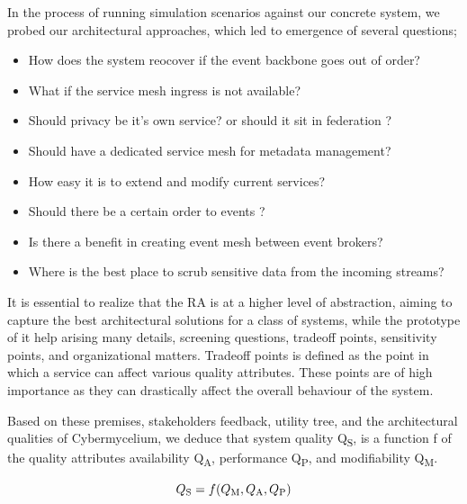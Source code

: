 \documentclass[review]{elsarticle}
\begin{document}
In the process of running simulation scenarios against our concrete system, we probed our architectural approaches, which led to emergence of several questions;

\begin{itemize}
    \item How does the system reocover if the event backbone goes out of order?
    \item What if the service mesh ingress is not available?
    \item Should privacy be it's own service? or should it sit in federation ?
    \item Should have a dedicated service mesh for metadata management?
    \item How easy it is to extend and modify current services?
    \item Should there be a certain order to events ?
    \item Is there a benefit in creating event mesh between event brokers?
    \item Where is the best place to scrub sensitive data from the incoming streams?
\end{itemize}

It is essential to realize that the RA is at a higher level of abstraction, aiming to capture the best architectural solutions for a class of systems, while the prototype of it help arising many details, screening questions, tradeoff points, sensitivity points, and organizational matters. Tradeoff points is defined as the point in which a service can affect various quality attributes. These points are of high importance as they can drastically affect the overall behaviour of the system.

Based on these premises, stakeholders feedback, utility tree, and the architectural qualities of Cybermycelium, we deduce that system quality Q\textsubscript{S}, is a function f of the quality attributes availability Q\textsubscript{A}, performance Q\textsubscript{P}, and modifiability Q\textsubscript{M}.

\begin{equation}
    Q\textsubscript{S} = f(Q\textsubscript{M}, Q\textsubscript{A}, Q\textsubscript{P})
\end{equation}
\end{document}
